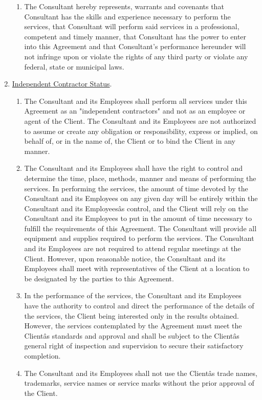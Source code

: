 \documentclass[12pt]{article}
\begin{document}
\begin{enumerate}
\begin{enumerate}
        \item The Consultant hereby represents, warrants and covenants that Consultant has the skills and experience necessary to perform the services, that Consultant will perform said services in a professional, competent and timely manner, that Consultant has the power to enter into this Agreement and that Consultant's performance hereunder will not infringe upon or violate the rights of any third party or violate any federal, state or municipal laws.
    \end{enumerate}
    \item \underline{Independent Contractor Status}.
    \begin{enumerate}
        \item The Consultant and its Employees shall perform all services under this Agreement as an "independent
        contractors" and not as an employee or agent of the Client.  The
        Consultant and its Employees are
        not authorized to assume or create any obligation or responsibility, express or implied, on behalf of, or in the name of, the Client or to bind the Client in any manner.
        \item The Consultant and its Employees shall have the right to control and determine the time, place, methods, manner and means of performing the services. In performing the services, the amount of time devoted by the Consultant and its Employees on any given day will be entirely within the Consultant and its Employeesâs control, and the Client will rely on the Consultant and its Employees to put in the amount of time necessary to fulfill the requirements of this Agreement.  The Consultant will provide all equipment and supplies required to perform the services.  The
        Consultant and its Employees are
        not required to attend regular meetings at the Client.  However, upon reasonable notice, the Consultant and its Employees shall meet with representatives of the Client at a location to be designated by the parties to this Agreement.
        \item In the performance of the services, the
        Consultant and its Employees have
        the authority to control and direct the performance of the details of the services, the Client being interested only in the results obtained.  However, the services contemplated by the Agreement must meet the Clientâs standards and approval and shall be subject to the Clientâs general right of inspection and supervision to secure their satisfactory completion.
        \item The Consultant and its Employees shall not use the Clientâs trade names, trademarks, service names or service marks without the prior approval of the Client.

\end{enumerate}
\end{enumerate}
\end{document}
